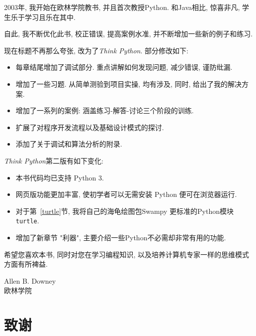 \documentclass[10pt]{book}
\begin{document}
2003年, 我开始在欧林学院教书, 并且首次教授Python. 
和Java相比, 惊喜非凡, 学生乐于学习且乐在其中. 

自此, 我不断优化此书, 校正错误, 提高案例水准, 
并不断增加一些新的例子和练习. 

现在标题不再那么夸张, 改为了{\em Think Python}. 
部分修改如下:

\begin{itemize}

\item 每章结尾增加了调试部分. 
重点讲解如何发现问题, 减少错误, 谨防纰漏. 

\item 增加了一些习题. 从简单测验到项目实操, 
均有涉及, 同时, 给出了我的解决方案. 

\item 增加了一系列的案例: 涵盖练习-解答-讨论三个阶段的训练. 

\item 扩展了对程序开发流程以及基础设计模式的探讨. 

\item 添加了关于调试和算法分析的附录. 

\end{itemize}

{\em Think Python}第二版有如下变化: 

\begin{itemize}

\item 本书代码均已支持 Python 3.

\item 网页版功能更加丰富, 使初学者可以无需安装 Python 便可在浏览器运行. 

\item 对于第~\ref{turtle}节, 我将自己的海龟绘图包Swampy 更标准的Python模块{\tt turtle}. 

\item 增加了新章节 "利器", 主要介绍一些Python不必需却非常有用的功能. 

\end{itemize}

希望您喜欢本书, 同时对您在学习编程知识, 以及培养计算机专家一样的思维模式
方面有所裨益. 



Allen B. Downey \\

欧林学院 \\


\section*{致谢}
\end{document}
